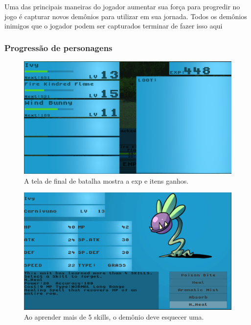 \documentclass[
	12pt,				%
	openright,			%
	twoside,			%
	a4paper,			%
	english,			%
	french,				%
	spanish,			%
	brazil				%
	]{abntex2}
\begin{document}
Uma das principais maneiras do jogador aumentar sua força para progredir no jogo é capturar novos demônios para utilizar em sua jornada. Todos os demônios inimigos que o jogador podem ser capturados
terminar de fazer isso aqui
\subsubsection{Progressão de personagens}

\begin{figure}[h!]
 \centering
  \includegraphics[width=0.5\linewidth]{endscreen.jpg}
  \caption{A tela de final de batalha mostra a exp e itens ganhos.}
  \label{fig:exp}
\end{figure}

\begin{figure}[h!]
 \centering
  \includegraphics[width=0.5\linewidth]{learn.jpg}
  \caption{Ao aprender mais de 5 skills, o demônio deve esquecer uma.}
  \label{fig:learn}
\end{figure}
\end{document}
